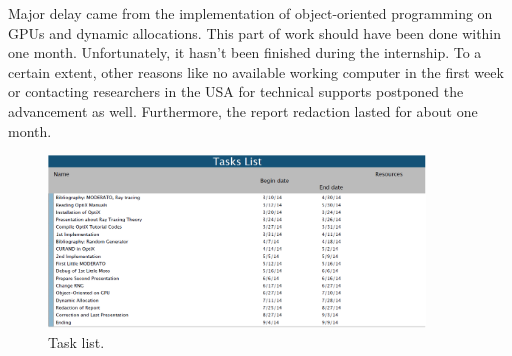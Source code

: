 Major delay came from the implementation of object-oriented programming on GPUs and dynamic allocations. This part of work should have been done within one month. Unfortunately, it hasn't been finished during the internship. To a certain extent, other reasons like no available working computer in the first week or contacting researchers in the USA for technical supports postponed the advancement as well. Furthermore, the report redaction lasted for about one month.
\begin{figure}[htbp]
	\centering
		\includegraphics[width=10cm]{Figures/task.png}
	\caption{Task list.}
\end{figure}
